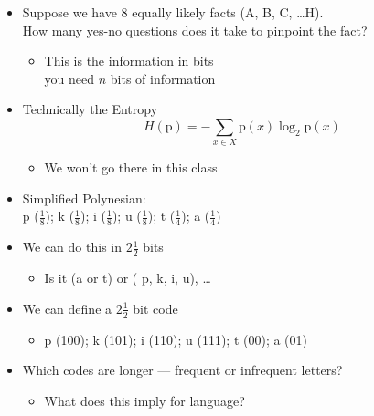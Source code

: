 \documentclass[a4paper,landscape,headrule,footrule,xetex]{foils}
\begin{document}

\begin{itemize}
\item Suppose we have 8 equally likely facts (A, B, C, \ldots H). 
 \\ How many yes-no   questions does it take to pinpoint the fact?
  \begin{itemize}
  \item This is the information in bits
\\ you need $n$ bits of information
  \end{itemize}
  \item Technically the Entropy %
 \[ H(\mathrm{p}) = -\sum_{x \in X} \mathrm{p}(x)\log_2\mathrm{p}(x) \]
    \begin{itemize}
    \item  We won't go there in this class
    \end{itemize}
  \end{itemize}


\begin{itemize}
\item Simplified Polynesian:
\\  p ($\frac{1}{8}$);
k ($\frac{1}{8}$);
i ($\frac{1}{8}$);
u ($\frac{1}{8}$);
   t ($\frac{1}{4}$);
   a ($\frac{1}{4}$)
\item We can do this in $2 \frac{1}{2}$ bits
  \begin{itemize}
  \item Is it (a or t) or ( p, k, i, u), \ldots
  \end{itemize}
\item We can define a $2 \frac{1}{2}$ bit code 
  \begin{itemize}
  \item p (100); k (101); i (110); u (111); t (00);  a (01)  
  \end{itemize}
\item Which codes are longer --- frequent or infrequent letters?
  \begin{itemize}
  \item What does this imply for language?
  \end{itemize}
\end{itemize}

\citep[\S2.2]{Manning:Schuetze:1999}


\end{document}
